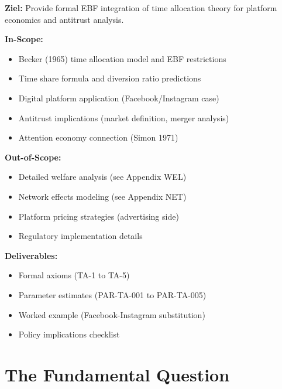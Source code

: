 \begin{tcolorbox}[colback=orange!5!white, colframe=orange!75!black,
    title=Appendix Scope: Time-Intensive Goods \& Platform Economics]

\textbf{Ziel:} Provide formal EBF integration of time allocation theory for platform economics and antitrust analysis.

\textbf{In-Scope:}
\begin{itemize}[nosep]
\item Becker (1965) time allocation model and EBF restrictions
\item Time share formula and diversion ratio predictions
\item Digital platform application (Facebook/Instagram case)
\item Antitrust implications (market definition, merger analysis)
\item Attention economy connection (Simon 1971)
\end{itemize}

\textbf{Out-of-Scope:}
\begin{itemize}[nosep]
\item Detailed welfare analysis (see Appendix WEL)
\item Network effects modeling (see Appendix NET)
\item Platform pricing strategies (advertising side)
\item Regulatory implementation details
\end{itemize}

\textbf{Deliverables:}
\begin{itemize}[nosep]
\item Formal axioms (TA-1 to TA-5)
\item Parameter estimates (PAR-TA-001 to PAR-TA-005)
\item Worked example (Facebook-Instagram substitution)
\item Policy implications checklist
\end{itemize}

\end{tcolorbox}


\section{The Fundamental Question}
\label{sec:pt-fundamental}


